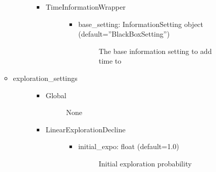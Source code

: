 \documentclass[letterpaper,10pt,english]{sphinxmanual}
\begin{document}
\begin{itemize}
\begin{description}
\begin{itemize}
\begin{description}
\begin{itemize}
\begin{description}
\begin{itemize}
\begin{description}
\end{description}

\end{itemize}

\end{description}

\item {} \begin{description}
\item[{TimeInformationWrapper}] \leavevmode\begin{itemize}
\item {} \begin{description}
\item[{base\_setting: InformationSetting object (default=”BlackBoxSetting”)}] \leavevmode
\sphinxAtStartPar
The base information setting to add time to

\end{description}

\end{itemize}

\end{description}

\end{itemize}

\end{description}

\item {} \begin{description}
\item[{exploration\_settings}] \leavevmode\begin{itemize}
\item {} \begin{description}
\item[{Global}] \leavevmode
\sphinxAtStartPar
None

\end{description}

\item {} \begin{description}
\item[{LinearExplorationDecline}] \leavevmode\begin{itemize}
\item {} \begin{description}
\item[{initial\_expo: float (default=1.0)}] \leavevmode
\sphinxAtStartPar
Initial exploration probability

\end{description}


\end{itemize}
\end{description}
\end{itemize}
\end{description}
\end{itemize}
\end{description}
\end{itemize}
\end{document}
